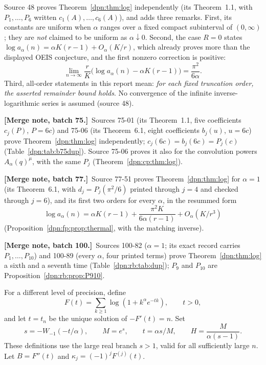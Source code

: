 \documentclass[11pt]{article}
\numberwithin{equation}{section}
\theoremstyle{definition}\newtheorem{definition}[theorem]{Definition}
\theoremstyle{remark}\newtheorem{remark}[theorem]{Remark}
\newcommand{\src}[1]{\textup{(source #1)}}
\newcommand{\mergenoteb}[1]{\par\smallskip\noindent\textbf{[Merge note, batch 75.]}\ #1\par\smallskip}
\newcommand{\mergenotec}[1]{\par\smallskip\noindent\textbf{[Merge note, batch 77.]}\ #1\par\smallskip}
\newcommand{\mergenoted}[1]{\par\smallskip\noindent\textbf{[Merge note, batch 100.]}\ #1\par\smallskip}
\begin{document}
Source 48 proves Theorem~\ref{dpn:thm:log} independently (its Theorem~1.1,
with $P_1,\dots,P_6$ written $c_1(A),\dots,c_6(A)$), and adds three remarks.
First, its constants are uniform when $\alpha$ ranges over a fixed compact
subinterval of $(0,\infty)$; they are \emph{not} claimed to be uniform as
$\alpha\downarrow0$.  Second, the case $R=0$ states
$\log a_\alpha(n)=\alpha K(r-1)+O_\alpha(K/r)$, which already proves more than
the displayed OEIS conjecture, and the first nonzero correction is positive:
\begin{equation}\label{dpn:48:eq:firstlimit}
 \lim_{n\to\infty}\frac{r}{K}
       \bigl(\log a_\alpha(n)-\alpha K(r-1)\bigr)=\frac{\pi^2}{6\alpha}.
\end{equation}
Third, all-order statements in this report mean: \emph{for each fixed
truncation order, the asserted remainder bound holds}.  No convergence of the
infinite inverse-logarithmic series is assumed \src{48}.
\mergenoteb{Sources 75-01 (its Theorem~1.1, five coefficients $c_j(P)$,
$P=6c$) and 75-06 (its Theorem~6.1, eight coefficients $b_j(u)$, $u=6c$)
prove Theorem~\ref{dpn:thm:log} independently; $c_j(6c)=b_j(6c)=P_j(c)$
(Table~\ref{dpn:tab:b75dup}).  Source 75-06 proves it also for the convolution
powers $A_\alpha(q)^\mu$, with the same $P_j$
(Theorem~\ref{dpn:cp:thm:log}).}
\mergenotec{Source 77-51 proves Theorem~\ref{dpn:thm:log} for $\alpha=1$ (its
Theorem~6.1, with $d_j=P_j(\pi^2/6)$ printed through $j=4$ and checked through
$j=6$), and its first two orders for every $\alpha$, in the resummed form
\[
 \log a_\alpha(n)=\alpha K(r-1)+\frac{\pi^2K}{6\alpha(r-1)}+O_\alpha(K/r^3)
\]
(Proposition~\ref{dpn:fp:prop:thermal}, with the matching inverse).}
\mergenoted{Sources 100-82 ($\alpha=1$; its exact record carries
$P_1,\dots,P_{10}$) and 100-89 (every $\alpha$, four printed terms) prove
Theorem~\ref{dpn:thm:log} a sixth and a seventh time
(Table~\ref{dpn:rb:tab:dup}); $P_9$ and $P_{10}$ are
Proposition~\ref{dpn:rb:prop:P910}.}

For a different level of precision, define
\begin{equation}\label{dpn:eq:F}
 F(t)=\sum_{k\ge1}\log(1+k^\alpha e^{-tk}),\qquad t>0,
\end{equation}
and let $t=t_n$ be the unique solution of $-F'(t)=n$. Set
\begin{equation}\label{dpn:eq:phase}
 s=-W_{-1}(-t/\alpha),\qquad M=e^s,
 \qquad t=\alpha s/M,\qquad H=\frac M{\alpha(s-1)}.
\end{equation}
These definitions use the large real branch $s>1$, valid for all sufficiently
large $n$. Let $B=F''(t)$ and $\kappa_j=(-1)^jF^{(j)}(t)$.
\end{document}
